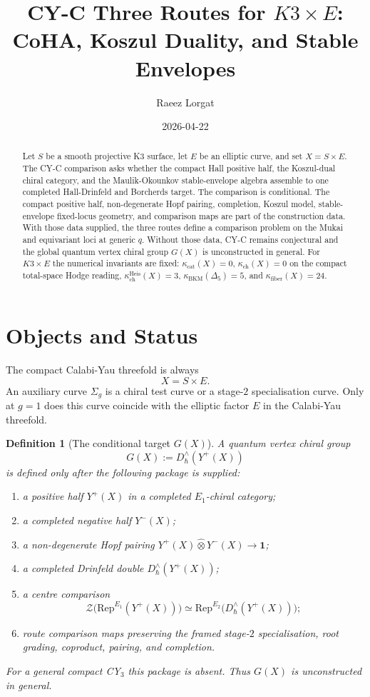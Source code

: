 \documentclass[11pt]{article}
\title{CY-C Three Routes for $K3 \times E$:\\
CoHA, Koszul Duality, and Stable Envelopes}
\author{Raeez Lorgat}
\date{2026-04-22}
\newtheorem{definition}[theorem]{Definition}
\providecommand{\Rep}{\mathrm{Rep}}
\providecommand{\cZ}{\mathcal{Z}}
\begin{document}
\maketitle

\begin{abstract}
Let $S$ be a smooth projective K3 surface, let $E$ be an elliptic
curve, and set $X=S\times E$. The CY-C comparison asks whether the
compact Hall positive half, the Koszul-dual chiral category, and the
Maulik-Okounkov stable-envelope algebra assemble to one completed
Hall-Drinfeld and Borcherds target. The comparison is conditional. The
compact positive half, non-degenerate Hopf pairing, completion, Koszul
model, stable-envelope fixed-locus geometry, and comparison maps are
part of the construction data. With those data supplied, the three
routes define a comparison problem on the Mukai and equivariant loci at
generic $q$. Without those data, CY-C remains conjectural and the
global quantum vertex chiral group $G(X)$ is unconstructed in general.
For $K3\times E$ the numerical invariants are fixed:
$\kappa_{\mathrm{cat}}(X)=0$, $\kappa_{\mathrm{ch}}(X)=0$ on the
compact total-space Hodge reading,
$\kappa_{\mathrm{ch}}^{\mathrm{Heis}}(X)=3$,
$\kappa_{\mathrm{BKM}}(\Delta_5)=5$, and
$\kappa_{\mathrm{fiber}}(X)=24$.
\end{abstract}

\tableofcontents

\section{Objects and Status}
\label{sec:objects-status}

The compact Calabi-Yau threefold is always
\[
 X=S\times E.
\]
An auxiliary curve $\Sigma_g$ is a chiral test curve or a stage-$2$
specialisation curve. Only at $g=1$ does this curve coincide with the
elliptic factor $E$ in the Calabi-Yau threefold.

\begin{definition}[The conditional target $G(X)$]
\label{def:conditional-GX}
A quantum vertex chiral group
\[
 G(X):=D_\hbar^\wedge(Y^+(X))
\]
is defined only after the following package is supplied:
\begin{enumerate}[label=\textup{(H\arabic*)}, leftmargin=2.2em]
\item a positive half $Y^+(X)$ in a completed $E_1$-chiral category;
\item a completed negative half $Y^-(X)$;
\item a non-degenerate Hopf pairing
$Y^+(X)\widehat\otimes Y^-(X)\to\mathbf{1}$;
\item a completed Drinfeld double $D_\hbar^\wedge(Y^+(X))$;
\item a centre comparison
\[
 \cZ\bigl(\Rep^{E_1}(Y^+(X))\bigr)
 \simeq
 \Rep^{E_2}\bigl(D_\hbar^\wedge(Y^+(X))\bigr);
\]
\item route comparison maps preserving the framed stage-$2$
specialisation, root grading, coproduct, pairing, and completion.
\end{enumerate}
For a general compact CY$_3$ this package is absent. Thus
$G(X)$ is unconstructed in general.
\end{definition}
\end{document}
